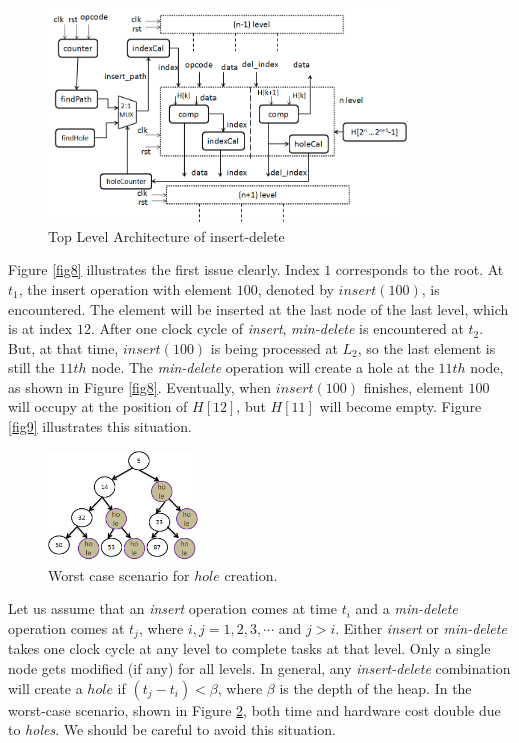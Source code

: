 \documentclass[10pt, conference, compsocconf]{IEEEtran}
\begin{document}
\begin{figure}[!ht]
  \centering
  \includegraphics[width=9.5cm]{Figures/2.png}
      \caption{Top Level Architecture of insert-delete}
    \label{fig10}
\end{figure}

Figure \ref{fig8} illustrates the first issue clearly.
Index $1$ corresponds to the root.
At $t_1$, the insert operation with element $100$, denoted by $insert(100)$, is encountered.
The element will be inserted at the last node of the last level, which is at index $12$.
After one clock cycle of {\it insert}, {\it min-delete} is encountered at $t_2$.
But, at that time, $insert(100)$ is being processed at $L_2$, so the last element is still the $11th$ node.
The {\it min-delete} operation will create a hole at the $11th$ node, as shown in Figure \ref{fig8}.
Eventually, when $insert(100)$ finishes, element $100$ will occupy at the position of $H[12]$, but $H[11]$ will become empty. 
Figure \ref{fig9} illustrates this situation.

\begin{figure}[!ht]
  \centering
  \includegraphics[width=4cm]{Figures/hole.png}
      \caption{Worst case scenario for $hole$ creation.}
    \label{hole}
\end{figure}

Let us assume that an {\it insert} operation comes at time $t_i$ and a {\it min-delete} operation comes at $t_j$, where $i, j = 1,2,3, \cdots$ and $j>i$.
Either {\it insert} or {\it min-delete} takes one clock cycle at any level to complete tasks at that level.
Only a single node gets modified (if any) for all levels.
In general, any {\it insert-delete} combination will create a $hole$ if $(t_j - t_i) < \beta$, where $\beta$ is the depth of the heap.
In the worst-case scenario, shown in Figure \ref{hole}, both time and hardware cost double due to {\it holes}. We should be careful to avoid this situation.
\end{document}
